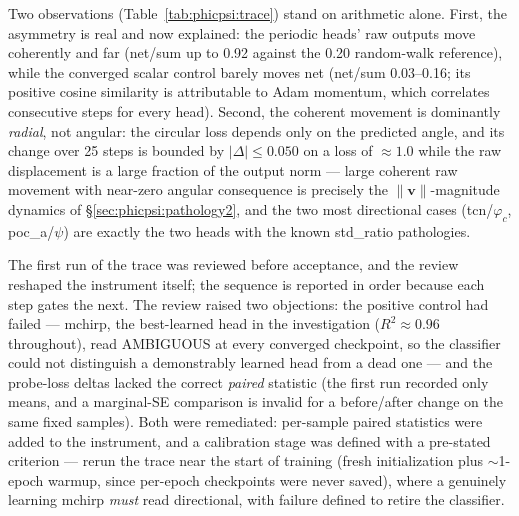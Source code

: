 \documentclass[11pt]{article}
\begin{document}
Two observations (Table~\ref{tab:phicpsi:trace}) stand on arithmetic alone.
First, the asymmetry is real and now explained: the periodic heads' raw outputs move coherently and far (net/sum up to 0.92 against the 0.20 random-walk reference), while the converged scalar control barely moves net (net/sum 0.03--0.16; its positive cosine similarity is attributable to Adam momentum, which correlates consecutive steps for every head).
Second, the coherent movement is dominantly \emph{radial}, not angular: the circular loss depends only on the predicted angle, and its change over 25 steps is bounded by $|\Delta| \le 0.050$ on a loss of ${\approx}1.0$ while the raw displacement is a large fraction of the output norm --- large coherent raw movement with near-zero angular consequence is precisely the $\lVert\mathbf{v}\rVert$-magnitude dynamics of \S\ref{sec:phicpsi:pathology2}, and the two most directional cases (tcn/$\varphi_c$, poc\_a/$\psi$) are exactly the two heads with the known std\_ratio pathologies.

The first run of the trace was reviewed before acceptance, and the review reshaped the instrument itself; the sequence is reported in order because each step gates the next.
The review raised two objections: the positive control had failed --- mchirp, the best-learned head in the investigation ($R^2 \approx 0.96$ throughout), read AMBIGUOUS at every converged checkpoint, so the classifier could not distinguish a demonstrably learned head from a dead one --- and the probe-loss deltas lacked the correct \emph{paired} statistic (the first run recorded only means, and a marginal-SE comparison is invalid for a before/after change on the same fixed samples).
Both were remediated: per-sample paired statistics were added to the instrument, and a calibration stage was defined with a pre-stated criterion --- rerun the trace near the start of training (fresh initialization plus ${\sim}$1-epoch warmup, since per-epoch checkpoints were never saved), where a genuinely learning mchirp \emph{must} read directional, with failure defined to retire the classifier.
\end{document}
